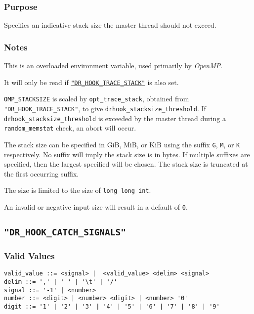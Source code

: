 \vspace{-2ex}
\subsubsection{Purpose}
\vspace{-2ex}
Specifies an indicative stack size the master thread should not exceed.

\vspace{-2ex}
\subsubsection{Notes}
\vspace{-2ex}
This is an overloaded environment variable, used primarily by \textit{OpenMP}.

It will only be read if \hyperref[section:flags:DR_HOOK_TRACE_STACK]{\texttt{"DR\_HOOK\_TRACE\_STACK"}} is also set.

\texttt{OMP\_STACKSIZE} is scaled by \verb|opt_trace_stack|, obtained from \hyperref[section:flags:DR_HOOK_TRACE_STACK]{\texttt{"DR\_HOOK\_TRACE\_STACK"}}, to give \verb|drhook_stacksize_threshold|. If \verb|drhook_stacksize_threshold| is exceeded by the master thread during a \verb|random_memstat| check, an abort will occur.

The stack size can be specified in GiB, MiB, or KiB using the suffix \texttt{G}, \texttt{M}, or \texttt{K} respectively. No suffix will imply the stack size is in bytes. If multiple suffixes are specified, then the largest specified will be chosen. The stack size is truncated at the first occurring suffix.

The size is limited to the size of \verb|long long int|.

An invalid or negative input size will result in a default of \texttt{0}.



\subsection{\texttt{"DR\_HOOK\_CATCH\_SIGNALS"}}
\label{section:flags:DR_HOOK_CATCH_SIGNALS}
\vspace{-2ex}
\subsubsection{Valid Values}
\vspace{-2ex}
\verb+valid_value ::= <signal> |  <valid_value> <delim> <signal>+ \\
\verb+delim ::= ',' | ' ' | '\t' | '/'+ \\
\verb+signal ::= '-1' | <number>+\\
\verb+number ::= <digit> | <number> <digit> | <number> '0'+ \\
\verb+digit ::= '1' | '2' | '3' | '4' | '5' | '6' | '7' | '8' | '9'+


